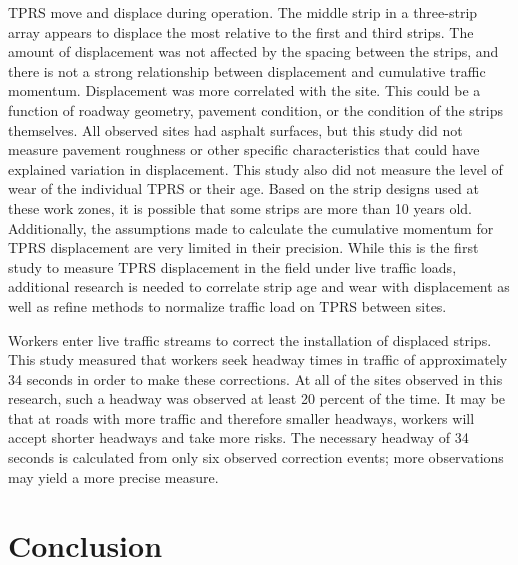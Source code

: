 \documentclass[
  letterpaper,
]{trb}
\begin{document}
TPRS move and displace during operation. The middle strip in a
three-strip array appears to displace the most relative to the first and
third strips. The amount of displacement was not affected by the spacing
between the strips, and there is not a strong relationship between
displacement and cumulative traffic momentum. Displacement was more
correlated with the site. This could be a function of roadway geometry,
pavement condition, or the condition of the strips themselves. All
observed sites had asphalt surfaces, but this study did not measure
pavement roughness or other specific characteristics that could have
explained variation in displacement. This study also did not measure the
level of wear of the individual TPRS or their age. Based on the strip
designs used at these work zones, it is possible that some strips are
more than 10 years old. Additionally, the assumptions made to calculate
the cumulative momentum for TPRS displacement are very limited in their
precision. While this is the first study to measure TPRS displacement in
the field under live traffic loads, additional research is needed to
correlate strip age and wear with displacement as well as refine methods
to normalize traffic load on TPRS between sites.

Workers enter live traffic streams to correct the installation of
displaced strips. This study measured that workers seek headway times in
traffic of approximately 34 seconds in order to make these corrections.
At all of the sites observed in this research, such a headway was
observed at least 20 percent of the time. It may be that at roads with
more traffic and therefore smaller headways, workers will accept shorter
headways and take more risks. The necessary headway of 34 seconds is
calculated from only six observed correction events; more observations
may yield a more precise measure.


\section{Conclusion}\label{conclusion}
\end{document}
